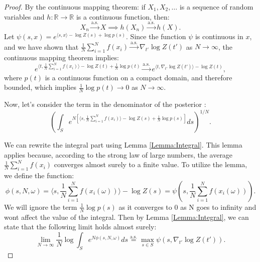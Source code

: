 \documentclass[10pt,a4paper]{amsart}
\begin{document}
\begin{proof}
By the continuous mapping theorem: if $X_1, X_2, \ldots$ is a sequence of random variables and $h: \mathbb{R} \to \mathbb{R}$ is a continuous function, then:
\begin{equation}
X_n \xrightarrow{\text{a.s.}} X \implies h(X_n) \xrightarrow{\text{a.s.}} h(X).
\end{equation}
Let $\psi(s, x) = e^{\langle s, x \rangle - \log Z(s) + \log p(s)}$. Since the function $\psi$ is continuous in $x$, and we have shown that $\frac{1}{N} \sum_{i=1}^N f(x_i) \xrightarrow{\text{a.s.}} \nabla_{t'} \log Z(t')$ as $N \to \infty$, the continuous mapping theorem implies:
\begin{equation}
 e^{\langle t, \frac{1}{N} \sum_{i=1}^N f(x_i) \rangle - \log Z(t) + \frac{1}{N}\log p(t)} \xrightarrow{\text{a.s.}} e^{\langle t, \nabla_{t'} \log Z(t') \rangle - \log Z(t)},
\end{equation}
where $p(t)$ is a continuous function on a compact domain, and therefore bounded, which implies $\frac{1}{N} \log p(t) \to 0$ as $N \to \infty$.

Now, let's consider the term in the denominator of the posterior :
\begin{equation}
\left( \int_S e^{N\left[\langle s, \frac{1}{N} \sum_{i=1}^N f(x_i) \rangle - \log Z(s) + \frac{1}{N} \log p(s)\right]} ds \right)^{1/N}.
\end{equation}

We can rewrite the integral part using Lemma \ref{Lemma:Integral}. This lemma applies because, according to the strong law of large numbers, the average $\frac{1}{N} \sum_{i=1}^N f(x_i)$ converges almost surely to a finite value. To utilize the lemma, we define the function:
\begin{equation}
\phi(s, N, \omega) = \langle s, \frac{1}{N} \sum_{i=1}^N f(x_i(\omega)) \rangle - \log Z(s) = \psi\left(s, \frac{1}{N} \sum_{i=1}^N f(x_i(\omega))\right).
\end{equation}
We will ignore the term $\frac{1}{N} \log p(s)$ as it converges to 0 as N goes to infinity and wont affect the value of the integral.
Then by Lemma \ref{Lemma:Integral}, we can state that the following limit holds almost surely:
\begin{equation}
\lim_{N \to \infty} \frac{1}{N} \log \int_S e^{N \phi(s, N, \omega)} ds \overset{\text{a.s.}}{=} \max_{s \in S} \psi(s, \nabla_{t'} \log Z(t')).
\end{equation}



\end{proof}
\end{document}
